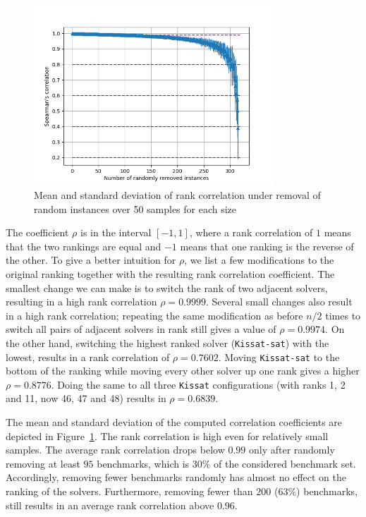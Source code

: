 \documentclass{elsarticle}
\newcommand{\solver}[1]{\texttt{#1}}
\begin{document}
\begin{figure}[t]
  \centering
  \includegraphics[width=0.8\textwidth]{stability/ALL_random_smpling_correlations.png}
  \caption{Mean and standard deviation of rank correlation under removal of random instances over 50 samples for each size}
   \label{fig:sampleAll}
\end{figure}
The coefficient $\rho$ is in the interval $[-1, 1]$, where a rank correlation of
$1$ means that the two rankings are equal and $-1$ means that one ranking is the
reverse of the other. To give a better intuition for $\rho$, we list a few
modifications to the original ranking together with the resulting rank
correlation coefficient. The smallest change we can make is to switch the rank
of two adjacent solvers, resulting in a high rank correlation $\rho = 0.9999$.
Several small changes also result in a high rank correlation; repeating the same
modification as before $n/2$ times to switch all pairs of adjacent solvers in
rank still gives a value of $\rho = 0.9974$. On the other hand, switching the
highest ranked solver (\solver{Kissat-sat}) with the lowest,
results in a rank correlation of $\rho = 0.7602$. Moving \solver{Kissat-sat} to
the bottom of the ranking while moving every other solver up one rank gives a
higher $\rho = 0.8776$. Doing the same to all three \solver{Kissat}
configurations (with ranks 1, 2 and 11, now 46, 47 and 48) results in
$\rho = 0.6839$.

The mean and standard deviation of the computed correlation coefficients are
depicted in Figure~\ref{fig:sampleAll}.
The rank correlation is high even for relatively small samples.
The average rank correlation drops below $0.99$ only after randomly removing at least $95$ benchmarks, which is $30\%$ of the considered benchmark set. Accordingly, removing fewer benchmarks randomly has almost no effect on the ranking of the solvers.
Furthermore, removing fewer than $200$ ($63\%$) benchmarks, still results in an average rank correlation above $0.96$.
\end{document}
